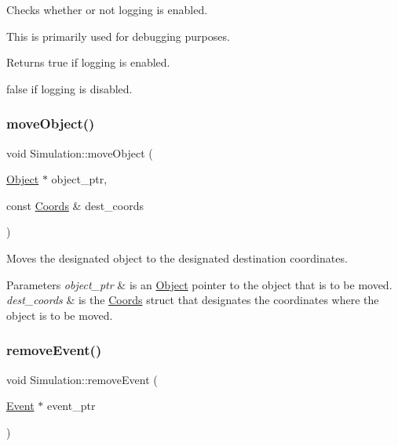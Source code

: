 Checks whether or not logging is enabled. 

This is primarily used for debugging purposes. \begin{DoxyReturn}{Returns}
true if logging is enabled. 

false if logging is disabled. 
\end{DoxyReturn}
\mbox{\label{class_simulation_a7b10f51640088366d0d1278361817e8d}} 
\subsubsection{\texorpdfstring{move\+Object()}{moveObject()}}
{\footnotesize\ttfamily void Simulation\+::move\+Object (\begin{DoxyParamCaption}\item[{\hyperlink{class_object}{Object} $\ast$}]{object\+\_\+ptr,  }\item[{const \hyperlink{struct_coords}{Coords} \&}]{dest\+\_\+coords }\end{DoxyParamCaption})\hspace{0.3cm}{\ttfamily [protected]}}



Moves the designated object to the designated destination coordinates. 


\begin{DoxyParams}{Parameters}
{\em object\+\_\+ptr} & is an \hyperlink{class_object}{Object} pointer to the object that is to be moved. \\
\hline
{\em dest\+\_\+coords} & is the \hyperlink{struct_coords}{Coords} struct that designates the coordinates where the object is to be moved. \\
\hline
\end{DoxyParams}
\mbox{\label{class_simulation_a3a4808231d4760f0ab30ea39b6a67e8c}} 
\subsubsection{\texorpdfstring{remove\+Event()}{removeEvent()}}
{\footnotesize\ttfamily void Simulation\+::remove\+Event (\begin{DoxyParamCaption}\item[{\hyperlink{class_event}{Event} $\ast$}]{event\+\_\+ptr }\end{DoxyParamCaption})\hspace{0.3cm}{\ttfamily [protected]}}



